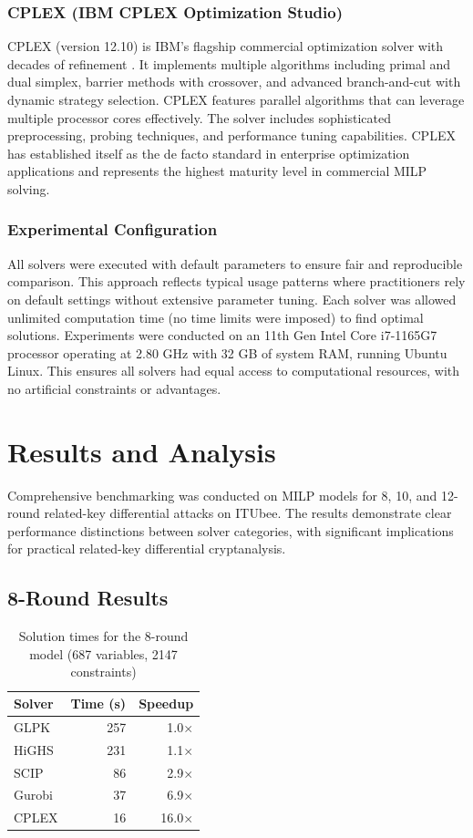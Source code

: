 \documentclass[11pt,a4paper]{article}
\begin{document}
\subsubsection{CPLEX (IBM CPLEX Optimization Studio)}
CPLEX (version 12.10) is IBM's flagship commercial optimization solver with decades of refinement \cite{cplex2024}. It implements multiple algorithms including primal and dual simplex, barrier methods with crossover, and advanced branch-and-cut with dynamic strategy selection. CPLEX features parallel algorithms that can leverage multiple processor cores effectively. The solver includes sophisticated preprocessing, probing techniques, and performance tuning capabilities. CPLEX has established itself as the de facto standard in enterprise optimization applications and represents the highest maturity level in commercial MILP solving.

\subsubsection{Experimental Configuration}
All solvers were executed with default parameters to ensure fair and reproducible comparison. This approach reflects typical usage patterns where practitioners rely on default settings without extensive parameter tuning. Each solver was allowed unlimited computation time (no time limits were imposed) to find optimal solutions. Experiments were conducted on an 11th Gen Intel Core i7-1165G7 processor operating at 2.80 GHz with 32 GB of system RAM, running Ubuntu Linux. This ensures all solvers had equal access to computational resources, with no artificial constraints or advantages.

\section{Results and Analysis}

Comprehensive benchmarking was conducted on MILP models for 8, 10, and 12-round related-key differential attacks on ITUbee. The results demonstrate clear performance distinctions between solver categories, with significant implications for practical related-key differential cryptanalysis.

\subsection{8-Round Results}

\begin{table}[ht]
  \centering
  \caption{Solution times for the 8-round model (687 variables, 2147 constraints)}
  \label{tab:8round}
  \begin{tabular}{lrr}
    \toprule
    Solver  & Time (s) & Speedup \\
    \midrule
    GLPK   & 257  & 1.0$\times$ \\
    HiGHS  & 231  & 1.1$\times$ \\
    SCIP   & 86   & 2.9$\times$ \\
    Gurobi & 37   & 6.9$\times$ \\
    CPLEX  & 16   & 16.0$\times$ \\
    \bottomrule
  \end{tabular}
\end{table}
\end{document}
